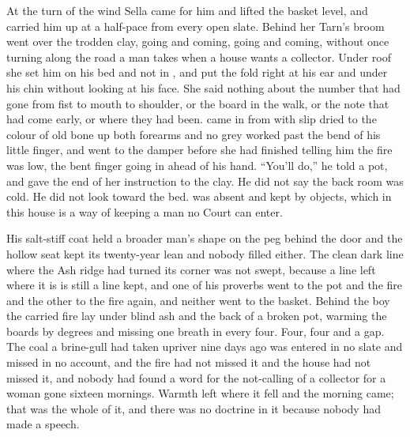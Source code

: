 At the turn of the wind Sella came for him and lifted the basket level, and carried him up  at a half-pace from every open slate. Behind her Tarn's broom went over the trodden clay, going and coming, going and coming, without once turning along the road a man takes when a house wants a collector. Under  roof she set him on his bed and not in , and put the fold right at his ear and under his chin without looking at his face. She said nothing about the number that had gone from fist to mouth to shoulder, or the board in the walk, or the note that had come early, or where they had been.  came in from  with slip dried to the colour of old bone up both forearms and no grey worked past the bend of his little finger, and went to the damper before she had finished telling him the fire was low, the bent finger going in ahead of his hand. “You'll do,” he told a pot, and gave the end of her instruction to the clay. He did not say the back room was cold. He did not look toward the bed.  was absent and kept by objects, which in this house is a way of keeping a man no Court can enter.

His salt-stiff coat held a broader man's shape on the peg behind the door and the hollow seat kept its twenty-year lean and nobody filled either. The clean dark line where the Ash ridge had turned its corner was not swept, because a line left where it is is still a line kept, and one of his proverbs went to the pot and the fire and the other to the fire again, and neither went to the basket. Behind the boy the carried fire lay under blind ash and the back of a broken pot, warming the boards by degrees and missing one breath in every four. Four, four and a gap. The coal a brine-gull had taken upriver nine days ago was entered in no slate and missed in no account, and the fire had not missed it and the house had not missed it, and nobody had found a word for the not-calling of a collector for a woman gone sixteen mornings. Warmth left where it fell and the morning came; that was the whole of it, and there was no doctrine in it because nobody had made a speech.

